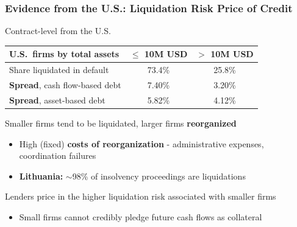 \documentclass[aspectratio=169,xcolor=table]{beamer}
\begin{document}
\begin{frame}[label=evidence] \frametitle{Evidence from the U.S.: Liquidation Risk Price of Credit \hfill \hyperlink{FCreorg}{}}

Contract-level from the U.S.  \vspace{-2mm}
\small
\begin{table}[h]
\centering
\renewcommand{\arraystretch}{1}
\begin{tabular}{lcc}
    \textbf{U.S.\ firms by total assets} & \textbf{$\leq$ 10M USD} & \textbf{$>$ 10M USD} \\
    \midrule
    Share liquidated in default & 73.4\% & 25.8\% \vspace{2mm} \\
    \textbf{Spread}, cash flow-based debt & 7.40\% & 3.20\% \\
    \textbf{Spread}, asset-based debt & 5.82\% & 4.12\% \\
    \bottomrule
\end{tabular}
\end{table}
\normalsize

Smaller firms tend to be liquidated, larger firms \textbf{reorganized}
\small 
\begin{itemize}
    \item High (fixed) \textbf{costs of reorganization} \footnotesize \hfill - administrative expenses, coordination failures
    \item \small \textcolor{primary}{\textbf{Lithuania:}} $\sim$98\% of insolvency proceedings are liquidations
\end{itemize} \vspace{3mm}
\normalsize

\pause

Lenders price in the higher liquidation risk associated with smaller firms
\small 
\begin{itemize}
    \item Small firms cannot credibly pledge future cash flows as collateral 
\end{itemize}
\normalsize

\end{frame}
\end{document}
